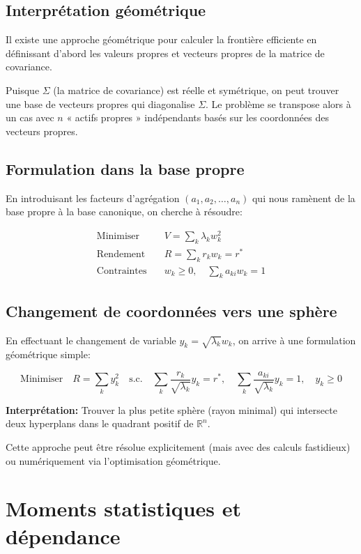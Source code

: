 \documentclass[11pt,a4paper]{article}
\begin{document}
\subsection{Interprétation géométrique}

Il existe une approche géométrique pour calculer la frontière efficiente en définissant d'abord les valeurs propres et vecteurs propres de la matrice de covariance.

Puisque $\Sigma$ (la matrice de covariance) est réelle et symétrique, on peut trouver une base de vecteurs propres qui diagonalise $\Sigma$. Le problème se transpose alors à un cas avec $n$ « actifs propres » indépendants basés sur les coordonnées des vecteurs propres.

\subsection{Formulation dans la base propre}

En introduisant les facteurs d'agrégation $(a_1, a_2, \ldots, a_n)$ qui nous ramènent de la base propre à la base canonique, on cherche à résoudre:

\begin{align}
\text{Minimiser} \quad & V = \sum_k \lambda_k w_k^2 \\
\text{Rendement} \quad & R = \sum_k r_k w_k = r^* \\
\text{Contraintes} \quad & w_k \geq 0, \quad \sum_k a_{ki} w_k = 1
\end{align}

\subsection{Changement de coordonnées vers une sphère}

En effectuant le changement de variable $y_k = \sqrt{\lambda_k} w_k$, on arrive à une formulation géométrique simple:

\[
\text{Minimiser} \quad R = \sum_k y_k^2 \quad \text{s.c.} \quad \sum_k \frac{r_k}{\sqrt{\lambda_k}} y_k = r^*, \quad \sum_k \frac{a_{ki}}{\sqrt{\lambda_k}} y_k = 1, \quad y_k \geq 0
\]

\textbf{Interprétation:} Trouver la plus petite sphère (rayon minimal) qui intersecte deux hyperplans dans le quadrant positif de $\mathbb{R}^n$.

Cette approche peut être résolue explicitement (mais avec des calculs fastidieux) ou numériquement via l'optimisation géométrique.

\section{Moments statistiques et dépendance}
\end{document}
